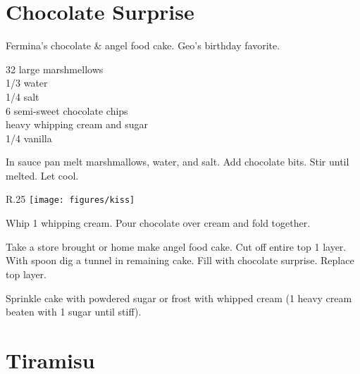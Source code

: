 \section{Chocolate Surprise}

\begin{open}
  Fermina's chocolate \& angel food cake.  Geo's birthday favorite.
\end{open}
\begin{ingredients}
  32 large marshmellows\\
  \SI{1/3}{\cup} water\\
  \SI{1/4}{\teaspoon} salt\\
  \SI{6}{\ounce} semi-sweet chocolate chips\\
  heavy whipping cream and sugar\\
  \SI{1/4}{\teaspoon} vanilla
\end{ingredients}
In sauce pan melt marshmallows, water, and salt.  Add chocolate bits.  Stir
until melted.  Let cool.

\begin{wrapfigure}{R}{.25\textwidth}
\centering\texttt{[image: figures/kiss]}
\end{wrapfigure}

Whip \SI{1}{\cup} whipping cream.  Pour chocolate over cream and fold
together.

Take a store brought or home make angel food cake.  Cut off entire top
\SI{1}{\inch} layer.  With spoon dig a tunnel in remaining cake.  Fill with
chocolate surprise.  Replace top layer.

Sprinkle cake with powdered sugar or frost with whipped cream (\SI{1}{\cup}
heavy cream beaten with \SI{1}{\tblspoon} sugar until stiff).

\section{Tiramisu}

